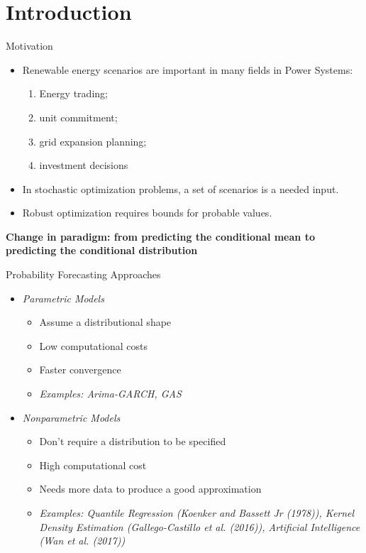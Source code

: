 \section{Introduction}\label{introduction}

\begin{frame}{Motivation}

\begin{itemize}
\item
  Renewable energy scenarios are important in many fields in Power
  Systems:

  \begin{enumerate}
  \def\labelenumi{\roman{enumi})}
  \tightlist
  \item
    Energy trading;
  \item
    unit commitment;
  \item
    grid expansion planning;
  \item
    investment decisions
  \end{enumerate}
\item
  In stochastic optimization problems, a set of scenarios is a needed
  input.
\item
  Robust optimization requires bounds for probable values.
\end{itemize}

\textbf{Change in paradigm: from predicting the conditional mean to
predicting the conditional distribution}

\end{frame}

\begin{frame}{Probability Forecasting Approaches}

\begin{itemize}
\tightlist
\item
  \emph{Parametric Models}

  \begin{itemize}
  \tightlist
  \item
    Assume a distributional shape
  \item
    Low computational costs
  \item
    Faster convergence
  \item
    \emph{Examples: Arima-GARCH, GAS}
  \end{itemize}
\item
  \emph{Nonparametric Models}

  \begin{itemize}
  \tightlist
  \item
    Don't require a distribution to be specified
  \item
    High computational cost
  \item
    Needs more data to produce a good approximation
  \item
    \emph{Examples: Quantile Regression (Koenker and Bassett Jr (1978)),
    Kernel Density Estimation (Gallego-Castillo et al. (2016)),
    Artificial Intelligence (Wan et al. (2017))}
  \end{itemize}
\end{itemize}

\end{frame}


